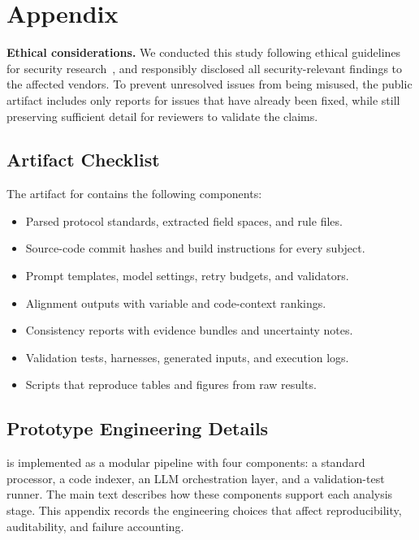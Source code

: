 \section{Appendix}
\label{sec:appendix}

\noindent \textbf{Ethical considerations.}
We conducted this study following ethical guidelines for security research~\cite{zhang2022ethics}, 
and responsibly disclosed all security-relevant findings to the affected 
vendors. To prevent unresolved issues from being misused, the public artifact 
includes only reports for issues that have already been fixed, while still 
preserving sufficient detail for reviewers to validate the claims.

\subsection{Artifact Checklist}

The artifact for \tool{} contains the following components:
\begin{itemize}[leftmargin=*]
  \item Parsed protocol standards, extracted field spaces, and rule files.
  \item Source-code commit hashes and build instructions for every subject.
  \item Prompt templates, model settings, retry budgets, and validators.
  \item Alignment outputs with variable and code-context rankings.
  \item Consistency reports with evidence bundles and uncertainty notes.
  \item Validation tests, harnesses, generated inputs, and execution logs.
  \item Scripts that reproduce tables and figures from raw results.
\end{itemize}

\subsection{Prototype Engineering Details}
\label{app:engineering}

\tool{} is implemented as a modular pipeline with four components: a standard
processor, a code indexer, an LLM orchestration layer, and a validation-test
runner. The main text describes how these components support each analysis
stage. This appendix records the engineering choices that affect
reproducibility, auditability, and failure accounting.

